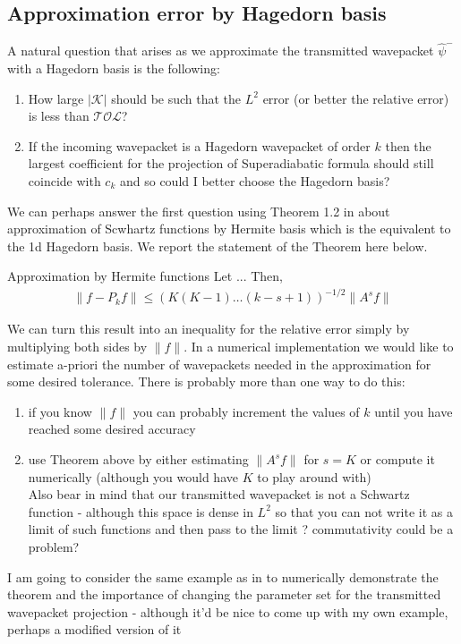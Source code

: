 \subsection{Approximation error by Hagedorn basis}
A natural question that arises as we approximate the transmitted wavepacket 
$\hat{\psi}^-$ with a Hagedorn basis is the following:
\begin{enumerate}
  \item How large $|\mathcal{K}|$ should be such that the $L^2$ error 
    (or better the relative error) is less than $\mathcal{TOL}$?
  \item If the incoming wavepacket is a Hagedorn wavepacket of order $k$ then 
    the largest coefficient for the projection of Superadiabatic formula should still
    coincide with $c_k$ and so could I better choose the Hagedorn basis?
\end{enumerate}
We can perhaps answer the first question using Theorem 1.2 in \cite{lubichQuantumClassicalMolecular2008}
about approximation of Scwhartz functions by Hermite basis which is the equivalent to the 
1d Hagedorn basis. We report the statement of the Theorem here below.
\begin{theorem}{Approximation by Hermite functions}
  Let ... 
  Then, 
  \begin{equation}
    \begin{split}
      \|f - P_k f\|
      \leq
      (K (K-1) \dots (k-s+1))^{-1/2}
      \|A^s f\|
    \end{split}
  \end{equation}
\end{theorem}
We can turn this result into an inequality for the relative error simply by multiplying 
both sides by $\|f\|$. In a numerical implementation we would like to estimate a-priori 
the number of wavepackets needed in the approximation for some desired 
tolerance. There is probably more than one way to do this:
\begin{enumerate}
  \item if you know $\|f\|$ you can probably increment the values of $k$ until 
    you have reached some desired accuracy
  \item use Theorem above by either estimating $\|A^sf\|$ for $s = K$ or 
    compute it numerically (although you would have $K$ to play around with)
    \\
    Also bear in mind that our transmitted wavepacket is not a Schwartz function - 
    although this space is dense in $L^2$ so that you can not write it as a limit of such 
    functions and then pass to the limit ? commutativity could be a problem?
\end{enumerate}
I am going to consider the same example as in \cite{lubichQuantumClassicalMolecular2008} 
to numerically demonstrate the theorem and the importance of changing the parameter 
set for the transmitted wavepacket projection - although it'd be nice to come 
up with my own example, perhaps a modified version of it
%
%
%
%
%
%
%
%
